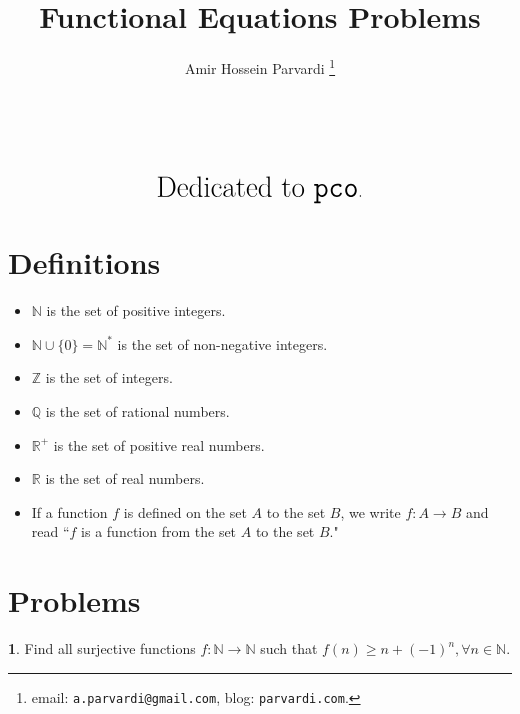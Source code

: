 \documentclass{article}
\theoremstyle{definition}
\newtheorem{p}{}
\begin{document}
\title{Functional Equations Problems}\author{Amir Hossein Parvardi \thanks{email: \texttt{a.parvardi@gmail.com}, blog: \texttt{parvardi.com}.}} \maketitle

\[ \]

\[ \]

\[ \]

\[ \huge{\text{Dedicated to } \texttt{pco}.}\]

\newpage

\section{Definitions}

\begin{itemize}

\item $\mathbb N$ is the set of positive integers.

\item $\mathbb N \cup \{ 0 \} = \mathbb N^*$ is the set of non-negative integers.

\item $\mathbb Z $ is the set of integers.

\item $\mathbb Q $ is the set of rational numbers.

\item $\mathbb R^+ $ is the set of positive real numbers.

\item $\mathbb R $ is the set of real numbers.

\item If a function $f$ is defined on the set $A$ to the set $B$, we write $f: A \to B$ and read ``$f$ is a function from the set $A$ to the set $B$."

\end{itemize}

\newpage

\section{Problems}

\begin{p}
Find all surjective functions $ f:\mathbb{N}\to\mathbb{N} $ such that $ f (n) \ge n+(-1)^n, \forall n \in \mathbb{N} $.
\end{p}
\end{document}
